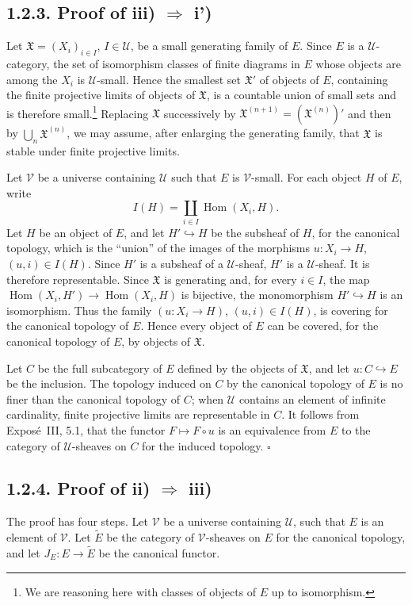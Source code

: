 \documentclass[11pt]{article}
\newcommand{\U}{\mathcal{U}}
\newcommand{\V}{\mathcal{V}}
\newcommand{\Hom}{\operatorname{Hom}}
\newcommand{\qedtext}{\hfill\(\square\)}
\begin{document}
\subsection*{1.2.3. Proof of iii) \(\Rightarrow\) i')}
Let \(\mathfrak X=(X_i)_{i\in I}\), \(I\in\U\), be a small generating family of \(E\). Since \(E\) is a \(\U\)-category, the set of isomorphism classes of finite diagrams in \(E\) whose objects are among the \(X_i\) is \(\U\)-small. Hence the smallest set \(\mathfrak X'\) of objects of \(E\), containing the finite projective limits of objects of \(\mathfrak X\), is a countable union of small sets and is therefore small.\footnote{We are reasoning here with classes of objects of \(E\) up to isomorphism.} Replacing \(\mathfrak X\) successively by \(\mathfrak X^{(n+1)}=(\mathfrak X^{(n)})'\) and then by \(\bigcup_n\mathfrak X^{(n)}\), we may assume, after enlarging the generating family, that \(\mathfrak X\) is stable under finite projective limits.

Let \(\V\) be a universe containing \(\U\) such that \(E\) is \(\V\)-small. For each object \(H\) of \(E\), write
\[
I(H)=\coprod_{i\in I}\Hom(X_i,H).
\]
Let \(H\) be an object of \(E\), and let \(H'\hookrightarrow H\) be the subsheaf of \(H\), for the canonical topology, which is the ``union'' of the images of the morphisms \(u:X_i\to H\), \((u,i)\in I(H)\). Since \(H'\) is a subsheaf of a \(\U\)-sheaf, \(H'\) is a \(\U\)-sheaf. It is therefore representable. Since \(\mathfrak X\) is generating and, for every \(i\in I\), the map \(\Hom(X_i,H')\to\Hom(X_i,H)\) is bijective, the monomorphism \(H'\hookrightarrow H\) is an isomorphism. Thus the family \((u:X_i\to H)\), \((u,i)\in I(H)\), is covering for the canonical topology of \(E\). Hence every object of \(E\) can be covered, for the canonical topology of \(E\), by objects of \(\mathfrak X\).

Let \(C\) be the full subcategory of \(E\) defined by the objects of \(\mathfrak X\), and let \(u:C\hookrightarrow E\) be the inclusion. The topology induced on \(C\) by the canonical topology of \(E\) is no finer than the canonical topology of \(C\); when \(\U\) contains an element of infinite cardinality, finite projective limits are representable in \(C\). It follows from Expos\'e~III, 5.1, that the functor \(F\mapsto F\circ u\) is an equivalence from \(E\) to the category of \(\U\)-sheaves on \(C\) for the induced topology. \qedtext

\subsection*{1.2.4. Proof of ii) \(\Rightarrow\) iii)}
The proof has four steps. Let \(\V\) be a universe containing \(\U\), such that \(E\) is an element of \(\V\). Let \(\widetilde E\) be the category of \(\V\)-sheaves on \(E\) for the canonical topology, and let \(J_E:E\to\widetilde E\) be the canonical functor.
\end{document}

